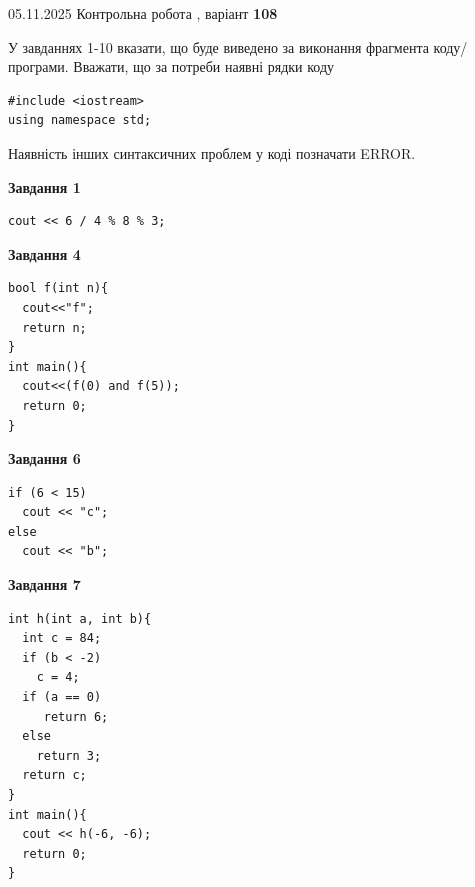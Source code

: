 \documentclass[12pt, ukrainian]{article}
\begin{document}
{\Large{05.11.2025 Контрольна робота , варіант  \No \textbf { 108 }\par}}
{
\begin {large}
У завданнях 1-10 вказати, що буде виведено за виконання фрагмента коду/про\-гра\-ми.
Вважати, що за потреби наявні рядки коду
\begin{verbatim}
#include <iostream>
using namespace std;
\end{verbatim}
Наявність інших синтаксичних проблем у коді позначати ERROR.

\begin{minipage}[t]{7.0cm}

\begin{center}
\textbf{Завдання 1}
\end{center}
\vspace{-8mm}

\begin{verbatim}
cout << 6 / 4 % 8 % 3;
\end{verbatim}



\begin{center}
\textbf{Завдання 4}
\end{center}
\vspace{-8mm}

\begin{verbatim}
bool f(int n){
  cout<<"f";
  return n;
}
int main(){
  cout<<(f(0) and f(5));
  return 0;
}
\end{verbatim}



\begin{center}
\textbf{Завдання 6}
\end{center}
\vspace{-8mm}

\begin{verbatim}
if (6 < 15)
  cout << "c";
else
  cout << "b";
\end{verbatim}



\begin{center}
\textbf{Завдання 7}
\end{center}
\vspace{-8mm}

\begin{verbatim}
int h(int a, int b){
  int c = 84;
  if (b < -2)
    c = 4;
  if (a == 0)
     return 6;
  else
    return 3;
  return c;
}
int main(){
  cout << h(-6, -6);
  return 0;
}
\end{verbatim}


\end{minipage}
\end{large}}
\end{document}
